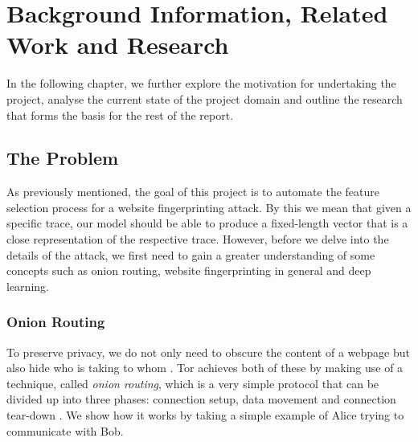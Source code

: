 \section{Background Information, Related Work and Research}
In the following chapter, we further explore the motivation for undertaking the project,
analyse the current state of the project domain and outline the research that forms the basis for the rest of the report.

\subsection{The Problem}
As previously mentioned, the goal of this project is to automate the feature selection process for a website fingerprinting attack.
By this we mean that given a specific trace, our model should be able to produce a fixed-length vector that is a close representation of the respective trace.
However, before we delve into the details of the attack, we first need to gain a greater understanding of some concepts such as
onion routing, website fingerprinting in general and deep learning.

\subsubsection{Onion Routing}
To preserve privacy, we do not only need to obscure the content of a webpage but also hide who is taking to whom \cite{goldschlag1999onion}.
Tor achieves both of these by making use of a technique, called \textit{onion routing}, which is a very simple protocol that can be divided up into three phases:
connection setup, data movement and connection tear-down \cite{goldschlag1999onion}. We show how it works by taking a simple example of Alice trying to communicate with Bob.

